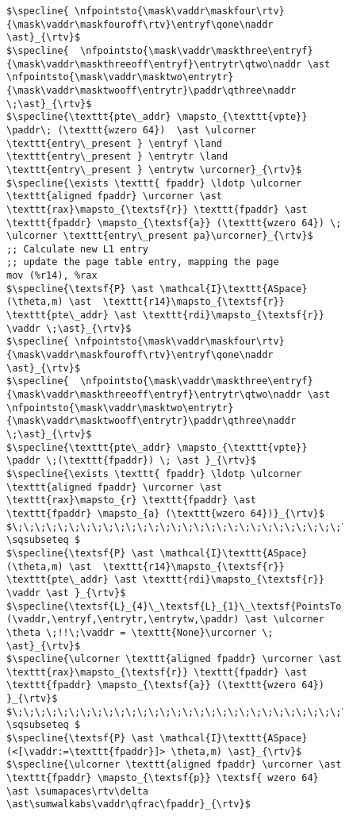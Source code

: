 \begin{figure}
\begin{lstlisting}
$\specline{ \nfpointsto{\mask\vaddr\maskfour\rtv}{\mask\vaddr\maskfouroff\rtv}\entryf\qone\naddr \ast}_{\rtv}$ 
$\specline{  \nfpointsto{\mask\vaddr\maskthree\entryf}{\mask\vaddr\maskthreeoff\entryf}\entrytr\qtwo\naddr \ast \nfpointsto{\mask\vaddr\masktwo\entrytr}{\mask\vaddr\masktwooff\entrytr}\paddr\qthree\naddr \;\ast}_{\rtv}$
$\specline{\texttt{pte\_addr} \mapsto_{\texttt{vpte}} \paddr\; (\texttt{wzero 64})  \ast \ulcorner \texttt{entry\_present } \entryf \land \texttt{entry\_present } \entrytr \land  \texttt{entry\_present } \entrytw \urcorner}_{\rtv}$
$\specline{\exists \texttt{ fpaddr} \ldotp \ulcorner \texttt{aligned fpaddr} \urcorner \ast \texttt{rax}\mapsto_{\textsf{r}} \texttt{fpaddr} \ast \texttt{fpaddr} \mapsto_{\textsf{a}} (\texttt{wzero 64}) \; \ulcorner \texttt{entry\_present pa}\urcorner}_{\rtv}$
;; Calculate new L1 entry
;; update the page table entry, mapping the page
mov (%r14), %rax
$\specline{\textsf{P} \ast \mathcal{I}\texttt{ASpace}(\theta,m) \ast  \texttt{r14}\mapsto_{\textsf{r}} \texttt{pte\_addr} \ast \texttt{rdi}\mapsto_{\textsf{r}} \vaddr \;\ast}_{\rtv}$
$\specline{ \nfpointsto{\mask\vaddr\maskfour\rtv}{\mask\vaddr\maskfouroff\rtv}\entryf\qone\naddr \ast}_{\rtv}$ 
$\specline{  \nfpointsto{\mask\vaddr\maskthree\entryf}{\mask\vaddr\maskthreeoff\entryf}\entrytr\qtwo\naddr \ast \nfpointsto{\mask\vaddr\masktwo\entrytr}{\mask\vaddr\masktwooff\entrytr}\paddr\qthree\naddr \;\ast}_{\rtv}$
$\specline{\texttt{pte\_addr} \mapsto_{\texttt{vpte}} \paddr \;(\texttt{fpaddr}) \; \ast }_{\rtv}$
$\specline{\exists \texttt{ fpaddr} \ldotp \ulcorner \texttt{aligned fpaddr} \urcorner \ast \texttt{rax}\mapsto_{r} \texttt{fpaddr} \ast \texttt{fpaddr} \mapsto_{a} (\texttt{wzero 64})}_{\rtv}$
$\;\;\;\;\;\;\;\;\;\;\;\;\;\;\;\;\;\;\;\;\;\;\;\;\;\;\;\;\;\;\;\;\;\;\;\;\;\;\;\;\;\;\;\; \sqsubseteq $
$\specline{\textsf{P} \ast \mathcal{I}\texttt{ASpace}(\theta,m) \ast  \texttt{r14}\mapsto_{\textsf{r}} \texttt{pte\_addr} \ast \texttt{rdi}\mapsto_{\textsf{r}} \vaddr \ast }_{\rtv}$
$\specline{\textsf{L}_{4}\_\textsf{L}_{1}\_\textsf{PointsTo}(\vaddr,\entryf,\entrytr,\entrytw,\paddr) \ast \ulcorner \theta \;!!\;\vaddr = \texttt{None}\urcorner \; \ast}_{\rtv}$
$\specline{\ulcorner \texttt{aligned fpaddr} \urcorner \ast \texttt{rax}\mapsto_{\textsf{r}} \texttt{fpaddr} \ast \texttt{fpaddr} \mapsto_{\textsf{a}} (\texttt{wzero 64}) }_{\rtv}$
$\;\;\;\;\;\;\;\;\;\;\;\;\;\;\;\;\;\;\;\;\;\;\;\;\;\;\;\;\;\;\;\;\;\;\;\;\;\;\;\;\;\;\;\; \sqsubseteq $
$\specline{\textsf{P} \ast \mathcal{I}\texttt{ASpace} (<[\vaddr:=\texttt{fpaddr}]> \theta,m) \ast}_{\rtv}$
$\specline{\ulcorner \texttt{aligned fpaddr} \urcorner \ast \texttt{fpaddr} \mapsto_{\textsf{p}} \textsf{ wzero 64} \ast \sumapaces\rtv\delta  \ast\sumwalkabs\vaddr\qfrac\fpaddr}_{\rtv}$

\end{lstlisting}
\end{figure}
